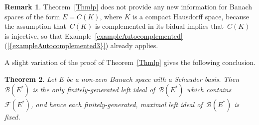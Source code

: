 \documentclass[12pt]{amsart}
\newtheorem{theorem}{Theorem}[section]
\theoremstyle{definition}
\newtheorem{remark}[theorem]{Remark}
\numberwithin{equation}{section}
\begin{document}
\begin{remark}
  Theorem~\ref{Thmlp} does not provide any new information for Banach
  spaces of the form $E = C(K)$, where $K$ is a compact Hausdorff
  space, because the assumption that~$C(K)$ is complemented in its
  bi\-dual implies that~$C(K)$ is injective, so that
  Example~\ref{exampleAutocomplemented}{{\normalfont\textrm{(\ref{{exampleAutocomplemented3}})}}}
  already applies.
\end{remark}

A slight variation of the proof of Theorem~\ref{Thmlp} gives the
following conclusion.

\begin{theorem}\label{TKNJLoct3Thm1}
  Let $E$ be a non-zero Banach space with a Schauder basis. Then
  $\mathscr{B}(E^*)$ is the only finitely-generated left ideal
  of~$\mathscr{B}(E^*)$ which contains~$\overline{\mathscr{F}(E^*)}$,
  and hence each finitely-generated, maximal left ideal
  of~$\mathscr{B}(E^*)$ is fixed.
\end{theorem}
\end{document}
